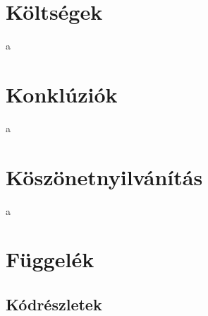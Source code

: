 \documentclass[12pt,a4paper]{article}
\begin{document}
\section{Költségek}
a
\section{Konklúziók}
a
\section{Köszönetnyilvánítás}
a
\pagebreak

\section*{Függelék}
\subsection*{Kódrészletek}
\end{document}
